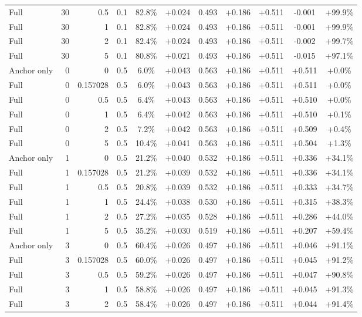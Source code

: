 \begin{table}[htbp]
\begin{tabular}{lrrrccccccc}
Full & 30 & 0.5 & 0.1 & 82.8\% & +0.024 & 0.493 & +0.186 & +0.511 & -0.001 & +99.9\% \\
Full & 30 & 1 & 0.1 & 82.8\% & +0.024 & 0.493 & +0.186 & +0.511 & -0.001 & +99.9\% \\
Full & 30 & 2 & 0.1 & 82.4\% & +0.024 & 0.493 & +0.186 & +0.511 & -0.002 & +99.7\% \\
Full & 30 & 5 & 0.1 & 80.8\% & +0.021 & 0.493 & +0.186 & +0.511 & -0.015 & +97.1\% \\
Anchor only & 0 & 0 & 0.5 & 6.0\% & +0.043 & 0.563 & +0.186 & +0.511 & +0.511 & +0.0\% \\
Full & 0 & 0.157028 & 0.5 & 6.0\% & +0.043 & 0.563 & +0.186 & +0.511 & +0.511 & +0.0\% \\
Full & 0 & 0.5 & 0.5 & 6.4\% & +0.043 & 0.563 & +0.186 & +0.511 & +0.510 & +0.0\% \\
Full & 0 & 1 & 0.5 & 6.4\% & +0.042 & 0.563 & +0.186 & +0.511 & +0.510 & +0.1\% \\
Full & 0 & 2 & 0.5 & 7.2\% & +0.042 & 0.563 & +0.186 & +0.511 & +0.509 & +0.4\% \\
Full & 0 & 5 & 0.5 & 10.4\% & +0.041 & 0.563 & +0.186 & +0.511 & +0.504 & +1.3\% \\
Anchor only & 1 & 0 & 0.5 & 21.2\% & +0.040 & 0.532 & +0.186 & +0.511 & +0.336 & +34.1\% \\
Full & 1 & 0.157028 & 0.5 & 21.2\% & +0.039 & 0.532 & +0.186 & +0.511 & +0.336 & +34.1\% \\
Full & 1 & 0.5 & 0.5 & 20.8\% & +0.039 & 0.532 & +0.186 & +0.511 & +0.333 & +34.7\% \\
Full & 1 & 1 & 0.5 & 24.4\% & +0.038 & 0.530 & +0.186 & +0.511 & +0.315 & +38.3\% \\
Full & 1 & 2 & 0.5 & 27.2\% & +0.035 & 0.528 & +0.186 & +0.511 & +0.286 & +44.0\% \\
Full & 1 & 5 & 0.5 & 35.2\% & +0.030 & 0.519 & +0.186 & +0.511 & +0.207 & +59.4\% \\
Anchor only & 3 & 0 & 0.5 & 60.4\% & +0.026 & 0.497 & +0.186 & +0.511 & +0.046 & +91.1\% \\
Full & 3 & 0.157028 & 0.5 & 60.0\% & +0.026 & 0.497 & +0.186 & +0.511 & +0.045 & +91.2\% \\
Full & 3 & 0.5 & 0.5 & 59.2\% & +0.026 & 0.497 & +0.186 & +0.511 & +0.047 & +90.8\% \\
Full & 3 & 1 & 0.5 & 58.8\% & +0.026 & 0.497 & +0.186 & +0.511 & +0.045 & +91.3\% \\
Full & 3 & 2 & 0.5 & 58.4\% & +0.026 & 0.497 & +0.186 & +0.511 & +0.044 & +91.4\% \\

\end{tabular}
\end{table}
